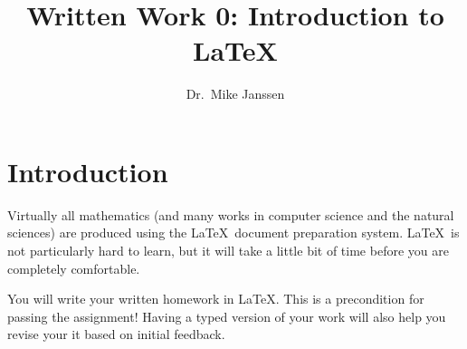 \documentclass[11pt]{amsart}
\title{Written Work 0: Introduction to \LaTeX}
\author{Dr.~Mike Janssen}
\date{}                                           %
\theoremstyle{plain}
\theoremstyle{definition}
\begin{document}
\maketitle


\section{Introduction}

Virtually all mathematics (and many works in computer science and the natural sciences) are produced using the \LaTeX\ document preparation system. \LaTeX\ is not particularly hard to learn, but it will take a little bit of time before you are completely comfortable.

You will write your written homework in \LaTeX. This is a precondition for passing the assignment! Having a typed version of your work will also help you revise your it based on initial feedback.
\end{document}
